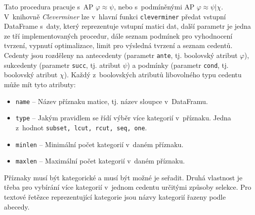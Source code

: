 Tato procedura pracuje s~AP $\varphi \approx \psi$, nebo s~podmíněnými AP $\varphi \approx \psi | \chi$. V~knihovně \emph{Cleverminer} lze v~hlavní funkci \texttt{cleverminer} předat vstupní DataFrame s~daty, který reprezentuje vstupní matici dat, další parametr je jedna ze tří implementovaných procedur, dále seznam podmínek pro vyhodnocení tvrzení, vypnutí optimalizace, limit pro výsledná tvrzení a seznam cedentů. Cedenty jsou rozděleny na antecedenty (parametr \texttt{ante}, tj. boolovský atribut $\varphi$), sukcedenty (parametr \texttt{succ}, tj. atribut $\psi$) a podmínky (parametr \texttt{cond}, tj. boolovský atribut $\chi$).
Každý z~boolovských atributů libovolného typu cedentu může mít tyto atributy:
\begin{itemize}
    \itemsep0em
    \item \texttt{name} -- Název příznaku matice, tj. název sloupce v~DataFramu.
    \item \texttt{type} -- Jakým pravidlem se řídí výběr více kategorií v~příznaku. Jedna z~hodnot \texttt{subset, lcut, rcut, seq, one}. 
    \item \texttt{minlen} -- Minimální počet kategorií v~daném příznaku.
    \item \texttt{maxlen} -- Maximální počet kategorií v~daném příznaku.\cite{bib:GUHAclever}
\end{itemize}

Příznaky musí být kategorické a musí být možné je seřadit. Druhá vlastnost je třeba pro vybírání více kategorií v~jednom cedentu určitými způsoby selekce. Pro textové řetězce reprezentující kategorie jsou názvy kategorií řazeny podle abecedy.\cite{bib:GUHAclever}


